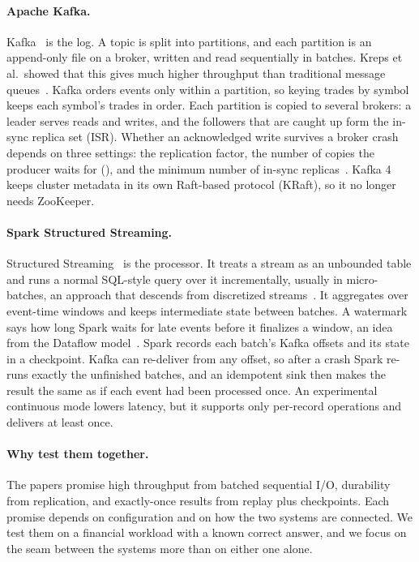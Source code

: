 \paragraph{Apache Kafka.} Kafka~\cite{kreps2011,wang2015} is the log. A topic is split into
partitions, and each partition is an append-only file on a broker, written and read sequentially in
batches. Kreps et al.\ showed that this gives much higher throughput than traditional message
queues~\cite{kreps2011}. Kafka orders events only within a partition, so keying trades by symbol keeps
each symbol's trades in order. Each partition is copied to several brokers: a leader serves reads and
writes, and the followers that are caught up form the in-sync replica set (ISR). Whether an acknowledged
write survives a broker crash depends on three settings: the replication factor, the number of copies
the producer waits for (), and the minimum number of in-sync replicas~\cite{wang2015}. Kafka 4
keeps cluster metadata in its own Raft-based protocol (KRaft), so it no longer needs ZooKeeper.

\paragraph{Spark Structured Streaming.} Structured Streaming~\cite{armbrust2018} is the processor. It
treats a stream as an unbounded table and runs a normal SQL-style query over it incrementally, usually
in micro-batches, an approach that descends from discretized streams~\cite{zaharia2013}. It aggregates
over event-time windows and keeps intermediate state between batches. A watermark says how long Spark
waits for late events before it finalizes a window, an idea from the Dataflow model~\cite{akidau2015}.
Spark records each batch's Kafka offsets and its state in a checkpoint. Kafka can re-deliver from any
offset, so after a crash Spark re-runs exactly the unfinished batches, and an idempotent sink then makes
the result the same as if each event had been processed once. An experimental continuous mode lowers
latency, but it supports only per-record operations and delivers at least once.

\paragraph{Why test them together.} The papers promise high throughput from batched sequential I/O,
durability from replication, and exactly-once results from replay plus checkpoints. Each promise
depends on configuration and on how the two systems are connected. We test them on a financial
workload with a known correct answer, and we focus on the seam between the systems more than on either
one alone.

